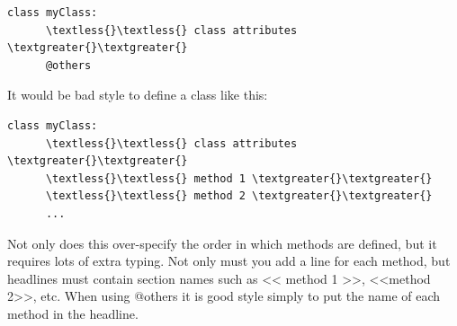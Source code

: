 \documentclass[a4paper,10pt,english]{sphinxmanual}
\begin{document}
\begin{Verbatim}[commandchars=\\\{\}]
class myClass:
      \textless{}\textless{} class attributes \textgreater{}\textgreater{}
      @others
\end{Verbatim}

It would be bad style to define a class like this:

\begin{Verbatim}[commandchars=\\\{\}]
class myClass:
      \textless{}\textless{} class attributes \textgreater{}\textgreater{}
      \textless{}\textless{} method 1 \textgreater{}\textgreater{}
      \textless{}\textless{} method 2 \textgreater{}\textgreater{}
      ...
\end{Verbatim}

Not only does this over-specify the order in which methods are defined, but it
requires lots of extra typing. Not only must you add a line for each method, but
headlines must contain section names such as \textless{}\textless{} method 1 \textgreater{}\textgreater{}, \textless{}\textless{}method 2\textgreater{}\textgreater{}, etc.
When using @others it is good style simply to put the name of each method in the
headline.
\end{document}
